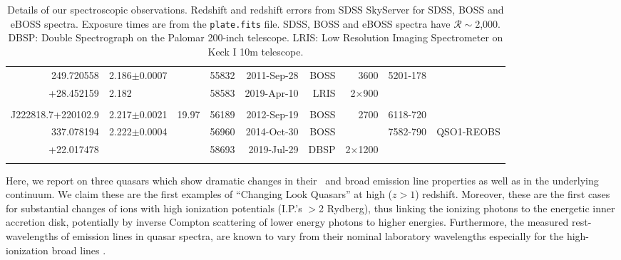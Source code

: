 \documentclass[a4paper,fleqn,usenatbib]{mnras}
\begin{document}
\begin{table}
\begin{tabular}{r  l  r r r   r r r r}
    249.720558	                 &  2.186$\pm$0.0007     &                          &  55832    & 2011-Sep-28     & BOSS            &   3600                  &  5201-178            & \\
    +28.452159                 &  2.182                           &                          &  58583    & 2019-Apr-10     & LRIS              &  2$\times$900    &                              & \\
                                        &                                      &                          &                &                            &                    &                              &                                & \\
    J222818.7+220102.9   & 2.217$\pm$0.0021      & 19.97                &  56189    & 2012-Sep-19     & BOSS             &  2700                 &   6118-720          & \\
    337.078194                 & 2.222$\pm$0.0004      &                          &  56960    & 2014-Oct-30     & BOSS             &                             &   7582-790          & QSO1-REOBS \\ 
    +22.017478                &                                      &                          &  58693    & 2019-Jul-29       & DBSP             & 2$\times$1200  &                           &    \\
                                       &                                       &                          &               &                            &                   &                              &                            & \\
    \hline \hline   
  \end{tabular}
  \caption{
    Details of our spectroscopic observations.
    Redshift and redshift errors from SDSS SkyServer for SDSS, BOSS and eBOSS spectra. 
    Exposure times are from the {\tt plate.fits} file.  SDSS, BOSS and  eBOSS spectra have $\mathcal{R}\sim$2,000.
    DBSP: Double Spectrograph on the Palomar 200-inch telescope.
    LRIS:  Low Resolution Imaging Spectrometer on Keck I 10m telescope.
  } 
  \label{tab:obs_notes}
\end{table}

Here, we report on three quasars  
which show dramatic changes in their \civ\ and \ciii broad emission
line properties as well as in the underlying continuum. We claim these
are the first examples of ``Changing Look Quasars'' at high ($z>1$)
redshift. Moreover, these are the first cases for substantial changes
of ions with high ionization potentials (I.P.'s $>$2 Rydberg), thus
linking the ionizing photons to the energetic inner accretion disk,
potentially by inverse Compton scattering of lower energy photons to
higher energies.  Furthermore, the measured rest-wavelengths of
emission lines in quasar spectra, are known to vary from their nominal
laboratory wavelengths especially for the high-ionization broad lines \citep[e.g.][]{VandenBerk2001}.
\end{document}
